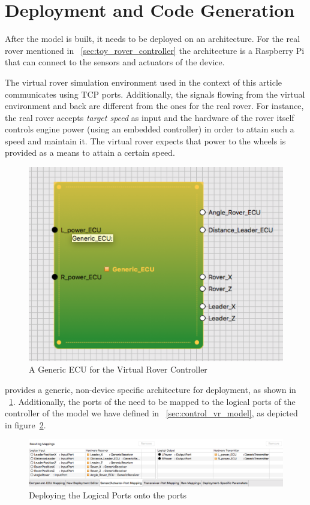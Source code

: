 \section{Deployment and Code Generation}
\label{sec:deploy_generate}

After the model is built, it needs to be deployed on an architecture. For the
real rover mentioned in \sect~\ref{sec:toy_rover_controller} the architecture
is a Raspberry Pi that can connect to the sensors and actuators of the device.

The virtual rover simulation environment used in the context of this article
communicates using TCP ports. Additionally, the signals flowing from the virtual
environment and back are different from the ones for the real rover. For
instance, the real rover accepts \emph{target speed} as input and the hardware
of the rover itself controls engine power (using an embedded \pid controller) in
order to attain such a speed and maintain it. The virtual rover expects that
power to the wheels is provided as a means to attain a certain speed.

\begin{figure}[!h]
\centering
\includegraphics[width=.8\textwidth]{images/newECU.png}
\caption{A Generic ECU for the Virtual Rover Controller}
\label{fig:deployment_general}
\end{figure}

\af provides a generic, non-device specific architecture for deployment, as
shown in \fig~\ref{fig:deployment_general}. Additionally, the ports of the \ecu
need to be mapped to the logical ports of the controller of the model we have
defined in \sect~\ref{sec:control_vr_model}, as depicted in
figure~\ref{fig:deployment_ports}.

\begin{figure}[!h]
\centering
\includegraphics[width=1\textwidth]{images/newMapping.png}
\caption{Deploying the Logical Ports onto the \ecu ports}
\label{fig:deployment_ports}
\end{figure}
 

